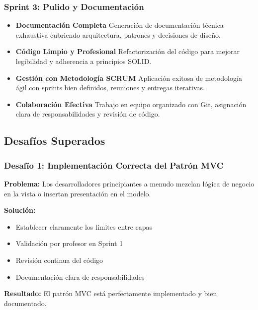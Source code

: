 \documentclass[12pt, a4paper]{article}
\begin{document}
\subsubsection{Sprint 3: Pulido y Documentación}

\begin{itemize}[leftmargin=2em]
    \item \textbf{Documentación Completa}
        Generación de documentación técnica exhaustiva cubriendo arquitectura, patrones y decisiones de diseño.
    
    \item \textbf{Código Limpio y Profesional}
        Refactorización del código para mejorar legibilidad y adherencia a principios SOLID.
    
    \item \textbf{Gestión con Metodología SCRUM}
        Aplicación exitosa de metodología ágil con sprints bien definidos, reuniones y entregas iterativas.
    
    \item \textbf{Colaboración Efectiva}
        Trabajo en equipo organizado con Git, asignación clara de responsabilidades y revisión de código.
\end{itemize}

\subsection{Desafíos Superados}

\subsubsection{Desafío 1: Implementación Correcta del Patrón MVC}

\textbf{Problema:} Los desarrolladores principiantes a menudo mezclan lógica de negocio en la vista o insertan presentación en el modelo.

\textbf{Solución:} 
\begin{itemize}[leftmargin=1.5em]
    \item Establecer claramente los límites entre capas
    \item Validación por profesor en Sprint 1
    \item Revisión continua del código
    \item Documentación clara de responsabilidades
\end{itemize}

\textbf{Resultado:} El patrón MVC está perfectamente implementado y bien documentado.
\end{document}
